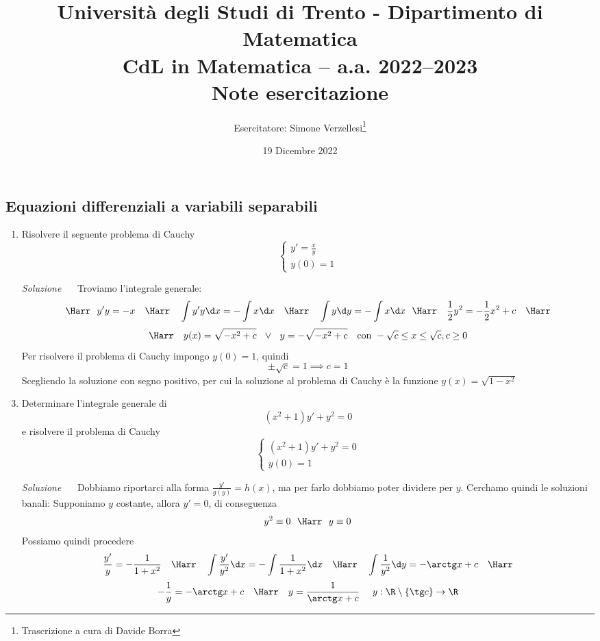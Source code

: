 \documentclass{article}
\title{Università degli Studi di Trento - Dipartimento di Matematica\\
CdL in Matematica – a.a. 2022–2023\\ Note esercitazione}
\author{Esercitatore: Simone Verzellesi\thanks{Trascrizione a cura di Davide Borra}}
\date{19 Dicembre 2022}
\begin{document}
\maketitle
{}
\setlength{\headheight}{30pt}
\subsection*{Equazioni differenziali a variabili separabili}
\begin{enumerate}[label=\textbf{Esercizio 13.\arabic*.},itemindent=*]
\item Risolvere il seguente problema di Cauchy
\[\begin{cases}
    y'=\frac{x}{y}\\
    y(0)=1
\end{cases}\]

\item[\textit{\large Soluzione~}]~
Troviamo l'integrale generale:
\[\Harr ~~ y'y=-x~~~\Harr~~~\int y'y\d x=-\int x \d x~~~\Harr~~~\int y\d y =-\int x \d x~~\Harr~~~\frac{1}{2}y^2=-\frac{1}{2}x^2+c~~~\Harr\]
\[\Harr~~~y(x)=\sqrt{-x^2+c}~~\lor~~ y=-\sqrt{-x^2+c}~~~\text{con}~-\sqrt{c}\leq x\leq \sqrt{c}, c\geq 0\]
Per risolvere il problema di Cauchy impongo $y(0)=1$, quindi
\[\pm\sqrt{c}=1\implies c=1\]
Scegliendo la soluzione con segno positivo, per cui la soluzione al problema di Cauchy è la funzione $y(x)=\sqrt{1-x^2}$
\item Determinare l'integrale generale di 
\[
    (x^2+1)y'+y^2=0   
\]
e risolvere il problema di Cauchy
\[\begin{cases}
    (x^2+1)y'+y^2=0 \\
    y(0)=1
\end{cases}\]
\item[\textit{\large Soluzione~}]~ Dobbiamo riportarci alla forma $\frac{y'}{g(y)}=h(x)$, ma per farlo dobbiamo poter dividere per $y$. Cerchamo quindi le soluzioni banali: Supponiamo $y$ costante, allora $y'=0$, di conseguenza
\[y^2\equiv 0~~\Harr~~y\equiv 0\]
Possiamo quindi procedere
\[\frac{y'}{y}=-\frac{1}{1+x^2}~~~\Harr~~~\int\frac{y'}{y^2}\d x=-\int\frac{1}{1+x^2}\d x~~~\Harr~~~\int\frac{1}{y^2}\d y=-\arctg x+c~~~\Harr\]
\[-\frac{1}{y}=-\arctg x +c~~~\Harr~~~y=\frac{1}{\arctg x +c}~~~~y: \R\setminus \{\tg c\}\to \R\]


\end{enumerate}
\end{document}
